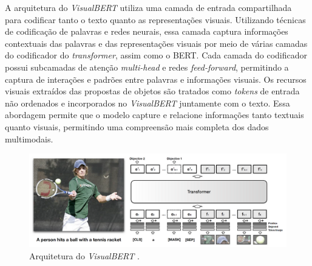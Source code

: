 A arquitetura do \textit{VisualBERT} utiliza uma camada de entrada compartilhada para codificar tanto o texto quanto as representações visuais. Utilizando técnicas de codificação de palavras e redes neurais, essa camada captura informações contextuais das palavras e das representações visuais por meio de várias camadas do codificador do \textit{transformer}, assim como o BERT. Cada camada do codificador possui subcamadas de atenção \textit{multi-head} e redes \textit{feed-forward}, permitindo a captura de interações e padrões entre palavras e informações visuais. Os recursos visuais extraídos das propostas de objetos são tratados como \textit{tokens} de entrada não ordenados e incorporados no \textit{VisualBERT} juntamente com o texto. Essa abordagem permite que o modelo capture e relacione informações tanto textuais quanto visuais, permitindo uma compreensão mais completa dos dados multimodais.


\begin{figure}[!htbp]
	\centering
	\includegraphics[scale=0.35]{imagens/visualBERT.png}
    \caption {Arquitetura do \textit{VisualBERT} \cite{VisualBERTArt}.}
\end{figure}



